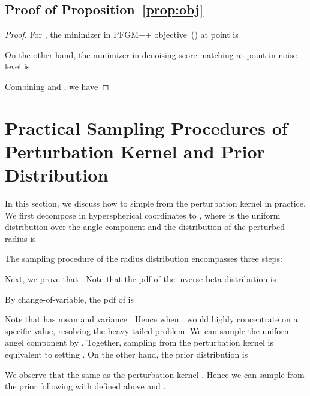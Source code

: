 \subsection{Proof of Proposition~\ref{prop:obj}}
\label{app:proof-propobj}
\propobj*
\begin{proof}
    For , the minimizer in PFGM++ objective~() at point  is


On the other hand, the minimizer in denoising score matching at point  in noise level  is


Combining  and , we have 


\end{proof}






















\section{Practical Sampling Procedures of Perturbation Kernel and Prior Distribution}
\label{app:sample-prior}
In this section, we discuss how to simple from the perturbation kernel  in practice. We first decompose  in hyperspherical coordinates to , where  is the uniform distribution over the angle component and the distribution of the perturbed radius  is

The sampling procedure of the radius distribution encompasses three steps:

Next, we prove that . Note that the pdf of the inverse beta distribution is

By change-of-variable, the pdf of  is


Note that  has mean  and variance . Hence when ,   would highly concentrate on a specific value, resolving the heavy-tailed problem. We can sample the uniform angel component by . Together, sampling from the perturbation kernel  is equivalent to setting . On the other hand, the prior distribution is 

We observe that  the same as the perturbation kernel . Hence we can sample from the prior following  with  defined above and .


\begin{comment}







\end{comment}

